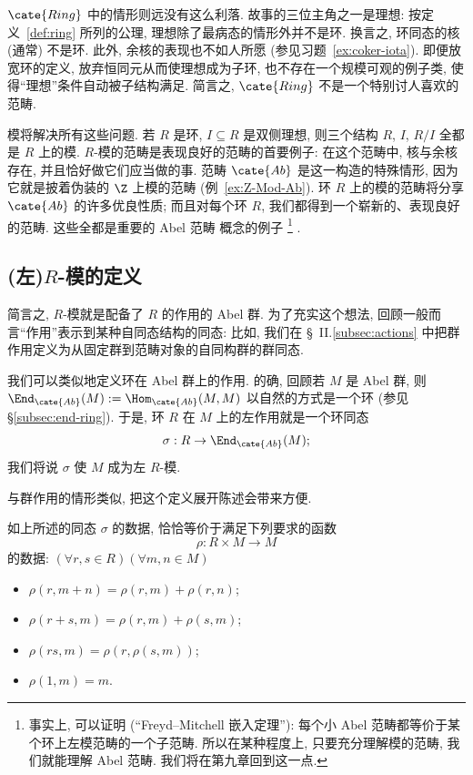 $\cate{Ring}$ 中的情形则远没有这么利落. 故事的三位主角之一是理想: 按定义~\ref{def:ring} 所列的公理, 理想除了最病态的情形外并不是环. 换言之, 环同态的核 (通常) 不是环. 此外, 余核的表现也不如人所愿 (参见习题~\ref{ex:coker-iota}). 即便放宽环的定义, 放弃恒同元从而使理想成为子环, 也不存在一个规模可观的例子类, 使得``理想''条件自动被子结构满足. 简言之, $\cate{Ring}$ 不是一个特别讨人喜欢的范畴.

模将解决所有这些问题. 若 $R$ 是环, $I \subseteq R$ 是双侧理想, 则三个结构 $R$, $I$, $R/I$ 全都是 $R$ 上的模. $R$-模的范畴是表现良好的范畴的首要例子: 在这个范畴中, 核与余核存在, 并且恰好做它们应当做的事. 范畴 $\cate{Ab}$ 是这一构造的特殊情形, 因为它就是披着伪装的 $\Z$ 上模的范畴 (例~\ref{ex:Z-Mod-Ab}). 环 $R$ 上的模的范畴将分享 $\cate{Ab}$ 的许多优良性质; 而且对每个环 $R$, 我们都得到一个崭新的、表现良好的范畴. 这些全都是重要的 Abel 范畴%
概念的例子%
\footnote{事实上, 可以证明 (``Freyd--Mitchell 嵌入定理''): 每个小 Abel 范畴都等价于某个环上左模范畴的一个子范畴. 所以在某种程度上, 只要充分理解模的范畴, 我们就能理解 Abel 范畴. 我们将在第九章回到这一点.}%
.

\subsection{(左)\texorpdfstring{$R$}{R}-模的定义}
\label{subsec:module-def}

简言之, $R$-模就是配备了 $R$ 的作用的 Abel 群. 为了充实这个想法, 回顾一般而言``作用''表示到某种自同态结构的同态: 比如, 我们在 \S~II.\ref{subsec:actions} 中把群作用定义为从固定群到范畴对象的自同构群的群同态.

我们可以类似地定义环在 Abel 群上的作用. 的确, 回顾若 $M$ 是 Abel 群, 则 $\End_{\cate{Ab}}(M) := \Hom_{\cate{Ab}}(M, M)$ 以自然的方式是一个环 (参见 \S\ref{subsec:end-ring}). 于是, 环 $R$ 在 $M$ 上的左作用就是一个环同态
\[
\sigma : R \to \End_{\cate{Ab}}(M);
\]
我们将说 $\sigma$ 使 $M$ 成为左 $R$-模.

与群作用的情形类似, 把这个定义展开陈述会带来方便.

\begin{claim}
\label{claim:module-data}
如上所述的同态 $\sigma$ 的数据, 恰恰等价于满足下列要求的函数
\[
\rho : R \times M \to M
\]
的数据: $(\forall r, s \in R) (\forall m, n \in M)$
\begin{itemize}
	\item $\rho(r, m + n) = \rho(r, m) + \rho(r, n)$;
	\item $\rho(r + s, m) = \rho(r, m) + \rho(s, m)$;
	\item $\rho(rs, m) = \rho(r, \rho(s, m))$;
	\item $\rho(1, m) = m$.
\end{itemize}
\end{claim}

